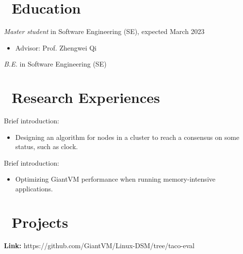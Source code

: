 \documentclass{resume}
\begin{document}



\section{\faGraduationCap\ Education}
\textit{Master student} in Software Engineering (SE), expected March 2023
\begin{itemize}
  \item Advisor: Prof. Zhengwei Qi
\end{itemize}
\textit{B.E.} in Software Engineering (SE)

\section{\faUsers\ Research Experiences}
Brief introduction:
\begin{itemize}
  \item Designing an algorithm for nodes in a cluster to reach a consensus on some status, such as clock.
\end{itemize}

Brief introduction:
\begin{itemize}
  \item Optimizing GiantVM performance when running memory-intensive applications.
\end{itemize}


\section{\faInfo\ Projects}
\textbf{Link:} https://github.com/GiantVM/Linux-DSM/tree/taco-eval
\end{document}
